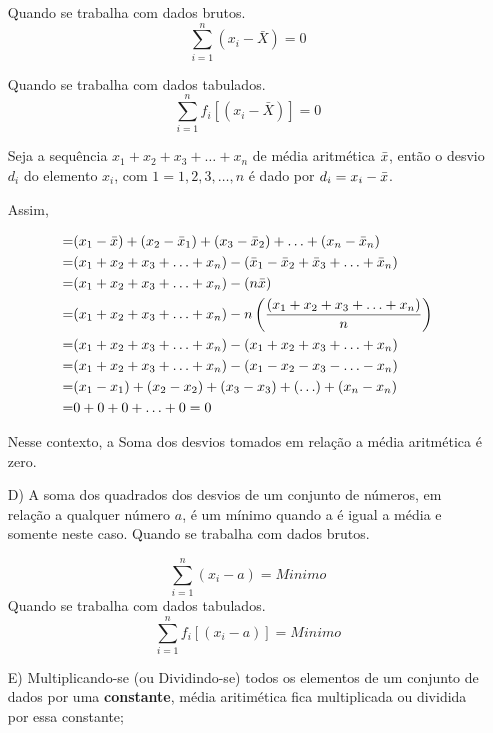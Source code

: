 \begin{enumerate}
Quando se trabalha com dados brutos.
$$ \sum_{i=1}^{n}(x_{i}-\bar{X})=0 $$


Quando se trabalha com dados tabulados.
$$ \sum_{i=1}^{n}f_{i}[(x_{i}-\bar{X})]=0 $$



\textbf{} 
\vskip0.3cm

Seja a sequência  $x_{1}+x_{2}+x_{3}+\ldots+x_{n}$ de média aritmética $\Bar{x}$, então o desvio $d_{i}$ do elemento $x_{i}$, com $1=1,2,3,\ldots,n$ é dado por $d_{i}=x_{i}-\Bar{x}$.
\vskip0.3cm


Assim, 

\begin{eqnarray*}
= & (x_{1}-\Bar{x})+(x_{2}-\Bar{x}_{1})+(x_{3}-\Bar{x}_{2})+\ldots+(x_{n}-\Bar{x}_{n}) \\
= & (x_{1}+x_{2}+x_{3}+\ldots+x_{n}) - (\Bar{x}_{1}-\Bar{x}_{2}+\Bar{x}_{3}+\ldots+\Bar{x}_{n})\\
= & (x_{1}+x_{2}+x_{3}+\ldots+x_{n})-(n\Bar{x})\\
= & (x_{1}+x_{2}+x_{3}+\ldots+x_{n})-n \left(\frac{(x_{1}+x_{2}+x_{3}+\ldots+x_{n})}{n} \right)\\
= & (x_{1}+x_{2}+x_{3}+\ldots+x_{n})-(x_{1}+x_{2}+x_{3}+\ldots+x_{n})\\
= & (x_{1}+x_{2}+x_{3}+\ldots+x_{n})-(x_{1}-x_{2}-x_{3}-\ldots-x_{n})\\
= & (x_{1}-x_{1})+(x_{2}-x_{2})+(x_{3}-x_{3})+(\ldots)+(x_{n}-x_{n})\\
= & 0+0+0+\ldots+0=0
\end{eqnarray*}

Nesse contexto, a Soma dos desvios tomados em relação a média aritmética é zero.




\newpage

\item [{D)}] A soma dos quadrados dos desvios de um conjunto de números, em relação a qualquer número $a$, é um mínimo quando a é igual a média e somente neste caso.\vskip0.3cm
Quando se trabalha com dados brutos.

$$ \sum_{i=1}^{n}(x_{i}- a)= Minimo  $$
Quando se trabalha com dados tabulados.
$$ \sum_{i=1}^{n}f_{i}[(x_{i}- a)]= Minimo  $$

  \item [{E)}] Multiplicando-se (ou Dividindo-se) todos os elementos
de um conjunto de dados por uma \textbf{constante}, média aritimética fica multiplicada ou dividida por essa constante;


\end{enumerate}
